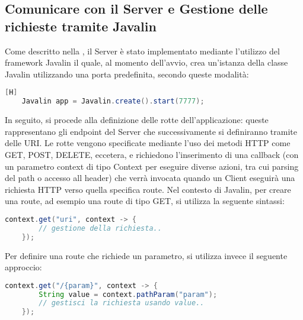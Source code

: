 \subsection{Comunicare con il Server e Gestione delle\\ richieste tramite Javalin}\label{subsub:javalin}
Come descritto nella , il Server è stato implementato mediante l'utilizzo del framework Javalin il quale, al momento dell'avvio, crea un'istanza della classe Javalin utilizzando una porta predefinita, secondo queste modalità:
\begin{lstlisting}[language=Java, firstnumber=1][H]
	Javalin app = Javalin.create().start(7777);
\end{lstlisting}


\noindent
In seguito, si procede alla definizione delle rotte dell'applicazione: queste rappresentano gli endpoint del Server che successivamente si definiranno tramite delle URI. Le rotte vengono specificate mediante l'uso dei metodi HTTP come GET, POST, DELETE, eccetera, e richiedono l'inserimento di una callback (con un parametro context di tipo Context per eseguire diverse azioni, tra cui parsing del path o accesso all header) che verrà invocata quando un Client eseguirà una richiesta HTTP verso quella specifica route. Nel contesto di Javalin, per creare una route, ad esempio una route di tipo GET, si utilizza la seguente sintassi:

\begin{lstlisting}[language=Java]
	context.get("uri", context -> {
		// gestione della richiesta..
	});
\end{lstlisting}

\noindent
Per definire una route che richiede un parametro, si utilizza invece il seguente approccio:
\begin{lstlisting}[language=Java]
	context.get("/{param}", context -> {
		String value = context.pathParam("param");
		// gestisci la richiesta usando value..
	});
\end{lstlisting}


